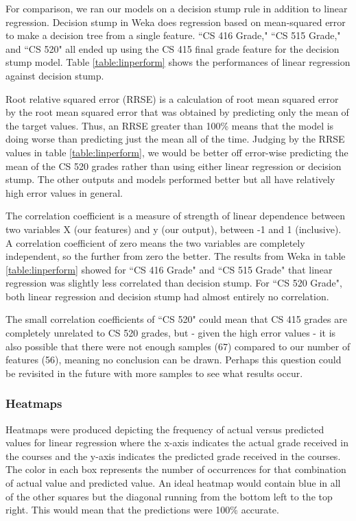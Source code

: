 \documentclass[letterpaper,11pt]{article}
\begin{document}
For comparison, we ran our models on a decision stump rule in addition to linear regression.  Decision stump in Weka does regression based on mean-squared error to make a decision tree from a single feature.  ``CS 416 Grade," ``CS 515 Grade," and ``CS 520" all ended up using the CS 415 final grade feature for the decision stump model.   Table \ref{table:linperform} shows the performances of linear regression against decision stump.

Root relative squared error (RRSE) is a calculation of root mean squared error by the root mean squared error that was obtained by predicting only the mean of the target values.  Thus, an RRSE greater than 100\% means that the model is doing worse than predicting just the mean all of the time.  Judging by the RRSE values in table \ref{table:linperform}, we would be better off error-wise predicting the mean of the CS 520 grades rather than using either linear regression or decision stump.  The other outputs and models performed better but all have relatively high error values in general.

The correlation coefficient is a measure of strength of linear dependence between two variables X (our features) and y (our output), between -1 and 1 (inclusive).  A correlation coefficient of zero means the two variables are completely independent, so the further from zero the better.  The results from Weka in table \ref{table:linperform} showed for ``CS 416 Grade" and ``CS 515 Grade" that linear regression was slightly less correlated than decision stump.  For ``CS 520 Grade", both linear regression and decision stump had almost entirely no correlation.

The small correlation coefficients of ``CS 520" could mean that CS 415 grades are completely unrelated to CS 520 grades, but - given the high error values - it is also possible that there were not enough samples (67) compared to our number of features (56), meaning no conclusion can be drawn.  Perhaps this question could be revisited in the future with more samples to see what results occur.

\subsubsection{Heatmaps}

Heatmaps were produced depicting the frequency of actual versus predicted values for linear regression where the x-axis indicates the actual grade received in the courses and the y-axis indicates the predicted grade received in the courses.  The color in each box represents the number of occurrences for that combination of actual value and predicted value.   An ideal heatmap would contain blue in all of the other squares but the diagonal running from the bottom left to the top right.  This would mean that the predictions were 100\% accurate. 
\end{document}
